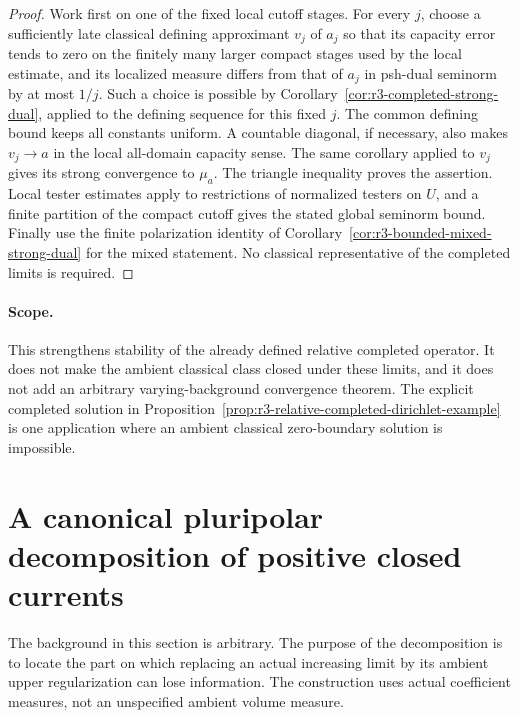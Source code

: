 \documentclass[11pt,a4paper]{article}
\numberwithin{equation}{section}
\theoremstyle{definition}
\theoremstyle{remark}
\begin{document}
\begin{proof}
Work first on one of the fixed local cutoff stages. For every
$j$, choose a sufficiently late classical defining approximant
$v_j$ of $a_j$ so that its capacity error tends to zero on the
finitely many larger compact stages used by the local estimate,
and its localized measure differs from that of $a_j$ in
psh-dual seminorm by at most $1/j$. Such a choice is possible
by Corollary~\ref{cor:r3-completed-strong-dual}, applied to the
defining sequence for this fixed $j$. The common defining bound
keeps all constants uniform. A countable diagonal, if necessary,
also makes $v_j\to a$ in the local all-domain capacity sense.
The same corollary applied to $v_j$ gives its strong convergence
to $\mathcal\mu_a$. The triangle inequality proves the assertion.
Local tester estimates apply to restrictions of normalized testers
on $U$, and a finite partition of the compact cutoff gives the
stated global seminorm bound. Finally use the finite polarization
identity of Corollary~\ref{cor:r3-bounded-mixed-strong-dual}
for the mixed statement. No classical representative of the
completed limits is required.
\end{proof}

\paragraph{Scope.}
This strengthens stability of the already defined relative
completed operator. It does not make the ambient classical class
closed under these limits, and it does not add an arbitrary
varying-background convergence theorem. The explicit completed
solution in Proposition~\ref{prop:r3-relative-completed-dirichlet-example}
is one application where an ambient classical zero-boundary
solution is impossible.



\section{A canonical pluripolar decomposition of positive closed currents}
\label{sec:r3-pluripolar-decomposition}

The background in this section is arbitrary. The purpose of the
decomposition is to locate the part on which replacing an actual
increasing limit by its ambient upper regularization can lose
information. The construction uses actual coefficient measures,
not an unspecified ambient volume measure.
\end{document}
